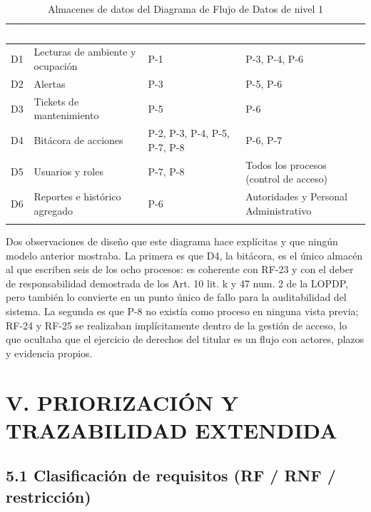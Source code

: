 \begingroup
\small
\begin{longtable}{|p{1.6cm}|p{4.6cm}|p{4.5cm}|p{4.1cm}|}
\hline
\cellcolor{sigagreen}\textcolor{white}{\textbf{ID}} & \cellcolor{sigagreen}\textcolor{white}{\textbf{Almacén de datos}} & \cellcolor{sigagreen}\textcolor{white}{\textbf{Alimentado por}} & \cellcolor{sigagreen}\textcolor{white}{\textbf{Consultado por}} \\ \hline
D1 & Lecturas de ambiente y ocupación & P-1 & P-3, P-4, P-6 \\ \hline
D2 & Alertas & P-3 & P-5, P-6 \\ \hline
D3 & Tickets de mantenimiento & P-5 & P-6 \\ \hline
D4 & Bitácora de acciones & P-2, P-3, P-4, P-5, P-7, P-8 & P-6, P-7 \\ \hline
D5 & Usuarios y roles & P-7, P-8 & Todos los procesos (control de acceso) \\ \hline
D6 & Reportes e histórico agregado & P-6 & Autoridades y Personal Administrativo \\ \hline
\caption{Almacenes de datos del Diagrama de Flujo de Datos de nivel 1}
\end{longtable}
\endgroup

Dos observaciones de diseño que este diagrama hace explícitas y que ningún modelo anterior mostraba. La primera es que D4, la bitácora, es el único almacén al que escriben seis de los ocho procesos: es coherente con RF-23 y con el deber de responsabilidad demostrada de los Art. 10 lit. k y 47 num. 2 de la LOPDP, pero también lo convierte en un punto único de fallo para la auditabilidad del sistema. La segunda es que P-8 no existía como proceso en ninguna vista previa; RF-24 y RF-25 se realizaban implícitamente dentro de la gestión de acceso, lo que ocultaba que el ejercicio de derechos del titular es un flujo con actores, plazos y evidencia propios.

\section*{V. PRIORIZACIÓN Y TRAZABILIDAD EXTENDIDA}


\subsection*{5.1 Clasificación de requisitos (RF / RNF / restricción)}


